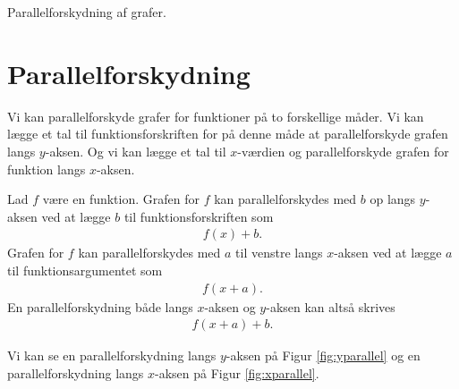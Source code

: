 
\begin{center}
	\Huge
	Parallelforskydning af grafer.
\end{center}

\section*{Parallelforskydning}

Vi kan parallelforskyde grafer for funktioner på to forskellige måder. Vi kan lægge et tal til funktionsforskriften for på denne måde at parallelforskyde grafen langs $y$-aksen. Og vi kan lægge et tal til $x$-værdien og parallelforskyde grafen for funktion langs $x$-aksen. 

\begin{setn}[Parallelforskydning]
	Lad $f$ være en funktion. Grafen for $f$ kan parallelforskydes med $b$ op langs $y$-aksen ved at lægge $b$
	til funktionsforskriften som
	\begin{align*}
		f(x) + b.
	\end{align*}
	Grafen for $f$ kan parallelforskydes med $a$ til venstre langs $x$-aksen ved at lægge $a$ til 
	funktionsargumentet som
	\begin{align*}
		f(x + a).
	\end{align*}
	En parallelforskydning både langs $x$-aksen og $y$-aksen kan altså skrives
	\begin{align*}
		f(x + a) + b.
	\end{align*}
\end{setn}
Vi kan se en parallelforskydning langs $y$-aksen på Figur \ref{fig:yparallel} og en parallelforskydning
langs $x$-aksen på Figur \ref{fig:xparallel}.
